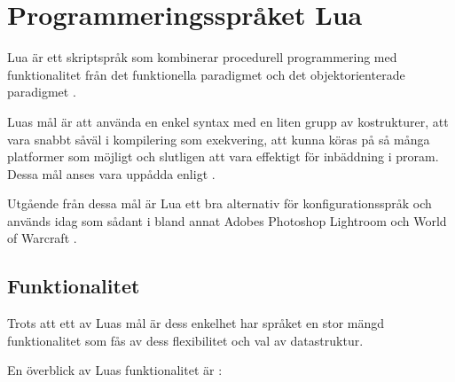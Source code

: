 
\section{Programmeringsspråket Lua}

Lua är ett skriptspråk som kombinerar procedurell programmering med
funktionalitet från det funktionella paradigmet och det objektorienterade
paradigmet \citep{luaimp}.

Luas mål är att använda en enkel syntax med en liten grupp av kostrukturer, att
vara snabbt såväl i kompilering som exekvering, att kunna köras på så många
platformer som möjligt och slutligen att vara effektigt för inbäddning i
proram. Dessa mål anses vara uppådda enligt \cite{luaimp}.

Utgående från dessa mål är Lua ett bra alternativ för konfigurationsspråk och
används idag som sådant i bland annat Adobes Photoshop Lightroom och World of
Warcraft \citep{lua}.

\subsection{Funktionalitet}

Trots att ett av Luas mål är dess enkelhet har språket en stor mängd
funktionalitet som fås av dess flexibilitet och val av datastruktur.

En överblick av Luas funktionalitet är \citep{luaimp}:

